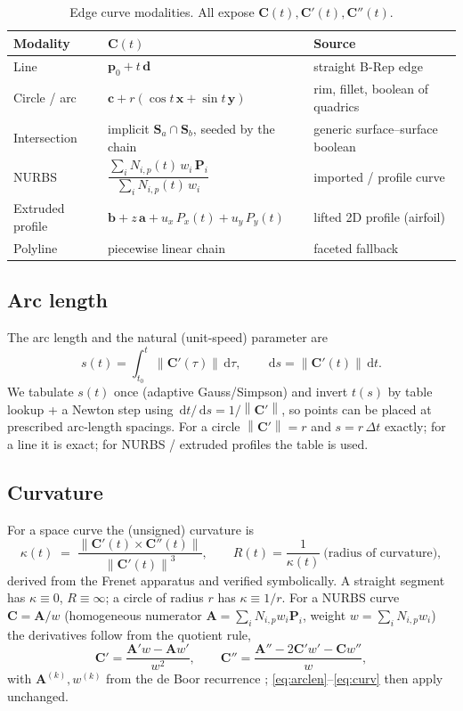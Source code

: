 \documentclass[11pt,a4paper]{article}
\numberwithin{equation}{section}
\newcommand{\norm}[1]{\left\lVert #1 \right\rVert}
\newcommand{\vv}[1]{\mathbf{#1}}
\newcommand{\dd}{\,\mathrm{d}}
\begin{document}
\begin{table}[H]\centering
\caption{Edge curve modalities. All expose $\vv{C}(t),\vv{C}'(t),\vv{C}''(t)$.}
\label{tab:curves}
\begin{tabularx}{\textwidth}{@{}l L X@{}}
\toprule
Modality & $\vv{C}(t)$ & Source \\
\midrule
Line & $\vv{p}_0 + t\,\vv{d}$ & straight B-Rep edge\\
Circle / arc & $\vv{c} + r(\cos t\,\vv{x} + \sin t\,\vv{y})$ & rim, fillet, boolean of quadrics\\
Intersection & implicit $\vv{S}_a\cap\vv{S}_b$, seeded by the chain & generic surface--surface boolean\\
NURBS & $\dfrac{\sum_i N_{i,p}(t)\,w_i\,\vv{P}_i}{\sum_i N_{i,p}(t)\,w_i}$ & imported / profile curve \cite{PieglTiller1997}\\
Extruded profile & $\vv{b}+z\,\vv{a}+u_x\,P_x(t)+u_y\,P_y(t)$ & lifted 2D profile (airfoil)\\
Polyline & piecewise linear chain & faceted fallback\\
\bottomrule
\end{tabularx}
\end{table}

\subsection{Arc length}
The arc length and the natural (unit-speed) parameter are
\begin{equation}
\label{eq:arclen}
s(t)=\int_{t_0}^{t}\norm{\vv{C}'(\tau)}\dd\tau,\qquad
\dd s = \norm{\vv{C}'(t)}\dd t .
\end{equation}
We tabulate $s(t)$ once (adaptive Gauss/Simpson) and invert $t(s)$ by table
lookup + a Newton step using $\dd t/\dd s = 1/\norm{\vv{C}'}$, so points can be
placed at prescribed arc-length spacings. For a circle $\norm{\vv{C}'}=r$ and
$s=r\,\Delta t$ exactly; for a line it is exact; for NURBS / extruded profiles
the table is used.

\subsection{Curvature}
For a space curve the (unsigned) curvature is
\begin{equation}
\label{eq:curv}
\kappa(t) \;=\; \frac{\norm{\vv{C}'(t)\times\vv{C}''(t)}}{\norm{\vv{C}'(t)}^{3}},
\qquad R(t)=\frac{1}{\kappa(t)}\ \text{(radius of curvature)},
\end{equation}
derived from the Frenet apparatus and verified symbolically. A straight segment
has $\kappa\equiv0$, $R\equiv\infty$; a circle of radius $r$ has $\kappa\equiv
1/r$. For a NURBS curve $\vv{C}=\vv{A}/w$ (homogeneous numerator
$\vv{A}=\sum_iN_{i,p}w_i\vv{P}_i$, weight $w=\sum_iN_{i,p}w_i$) the derivatives
follow from the quotient rule,
\begin{equation}
\label{eq:nurbsder}
\vv{C}'=\frac{\vv{A}'w-\vv{A}w'}{w^2},\qquad
\vv{C}''=\frac{\vv{A}''-2\vv{C}'w'-\vv{C}w''}{w},
\end{equation}
with $\vv{A}^{(k)},w^{(k)}$ from the de Boor recurrence \cite{PieglTiller1997};
\eqref{eq:arclen}--\eqref{eq:curv} then apply unchanged.
\end{document}
